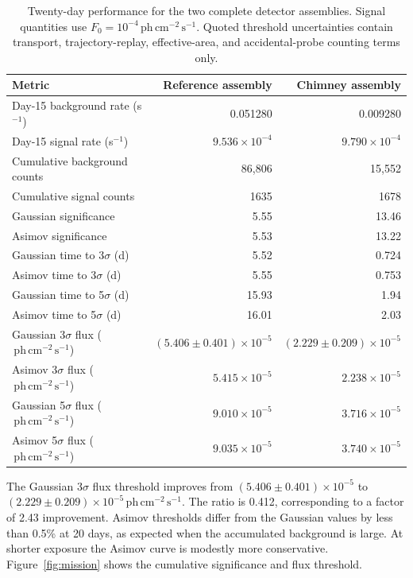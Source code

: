 \documentclass[11pt]{article}
\newcommand{\phflux}{\ensuremath{\,\mathrm{ph\,cm^{-2}\,s^{-1}}}\xspace}
\begin{document}
\begin{table}[t]
  \centering
  \caption{Twenty-day performance for the two complete detector assemblies.
  Signal quantities use $F_0=10^{-4}\phflux$. Quoted threshold uncertainties
  contain transport, trajectory-replay, effective-area, and accidental-probe
  counting terms only.}
  \label{tab:mission}
  \small
  \begin{tabularx}{\textwidth}{@{}Yrr@{}}
    \toprule
    Metric & Reference assembly & Chimney assembly \\
    \midrule
    Day-15 background rate (s$^{-1}$) & 0.051280 & 0.009280 \\
    Day-15 signal rate (s$^{-1}$) & $9.536\times10^{-4}$ & $9.790\times10^{-4}$ \\
    Cumulative background counts & 86,806 & 15,552 \\
    Cumulative signal counts & 1635 & 1678 \\
    Gaussian significance & 5.55 & 13.46 \\
    Asimov significance & 5.53 & 13.22 \\
    Gaussian time to 3$\sigma$ (d) & 5.52 & 0.724 \\
    Asimov time to 3$\sigma$ (d) & 5.55 & 0.753 \\
    Gaussian time to 5$\sigma$ (d) & 15.93 & 1.94 \\
    Asimov time to 5$\sigma$ (d) & 16.01 & 2.03 \\
    Gaussian 3$\sigma$ flux ($\phflux$) &
      $(5.406\pm0.401)\times10^{-5}$ &
      $(2.229\pm0.209)\times10^{-5}$ \\
    Asimov 3$\sigma$ flux ($\phflux$) &
      $5.415\times10^{-5}$ & $2.238\times10^{-5}$ \\
    Gaussian 5$\sigma$ flux ($\phflux$) &
      $9.010\times10^{-5}$ & $3.716\times10^{-5}$ \\
    Asimov 5$\sigma$ flux ($\phflux$) &
      $9.035\times10^{-5}$ & $3.740\times10^{-5}$ \\
    \bottomrule
  \end{tabularx}
\end{table}

The Gaussian 3$\sigma$ flux threshold improves from
$(5.406\pm0.401)\times10^{-5}$ to
$(2.229\pm0.209)\times10^{-5}\phflux$. The ratio is 0.412, corresponding to a
factor of 2.43 improvement. Asimov thresholds differ from the Gaussian values
by less than 0.5\% at 20 days, as expected when the accumulated background is
large. At shorter exposure the Asimov curve is modestly more conservative.
Figure~\ref{fig:mission} shows the cumulative significance and flux threshold.
\end{document}
